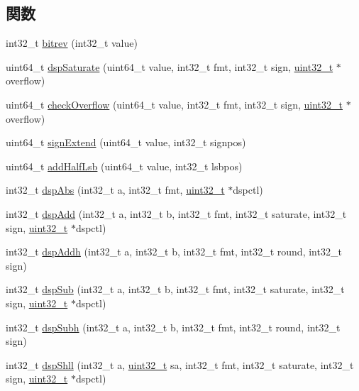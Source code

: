 \subsection*{関数}
\begin{DoxyCompactItemize}
\item 
int32\_\-t \hyperlink{namespaceMipsISA_a2754048764e174b0f0803486e4f829fd}{bitrev} (int32\_\-t value)
\item 
uint64\_\-t \hyperlink{namespaceMipsISA_a6853d9869c3a54c5a5cd34594ecf1f30}{dspSaturate} (uint64\_\-t value, int32\_\-t fmt, int32\_\-t sign, \hyperlink{Type_8hh_a435d1572bf3f880d55459d9805097f62}{uint32\_\-t} $\ast$overflow)
\item 
uint64\_\-t \hyperlink{namespaceMipsISA_aa0232b8b21b63c7893efa2ccbe2ad833}{checkOverflow} (uint64\_\-t value, int32\_\-t fmt, int32\_\-t sign, \hyperlink{Type_8hh_a435d1572bf3f880d55459d9805097f62}{uint32\_\-t} $\ast$overflow)
\item 
uint64\_\-t \hyperlink{namespaceMipsISA_a769dba9c69d884afe2d99cd0fcdb17bb}{signExtend} (uint64\_\-t value, int32\_\-t signpos)
\item 
uint64\_\-t \hyperlink{namespaceMipsISA_a6ca3b5075cddff927b0b7870b8b73d5f}{addHalfLsb} (uint64\_\-t value, int32\_\-t lsbpos)
\item 
int32\_\-t \hyperlink{namespaceMipsISA_a31dde0cc194f6c034d86c7c15efeb4c0}{dspAbs} (int32\_\-t a, int32\_\-t fmt, \hyperlink{Type_8hh_a435d1572bf3f880d55459d9805097f62}{uint32\_\-t} $\ast$dspctl)
\item 
int32\_\-t \hyperlink{namespaceMipsISA_a705975465e26de40169cc93f7a09aa3b}{dspAdd} (int32\_\-t a, int32\_\-t b, int32\_\-t fmt, int32\_\-t saturate, int32\_\-t sign, \hyperlink{Type_8hh_a435d1572bf3f880d55459d9805097f62}{uint32\_\-t} $\ast$dspctl)
\item 
int32\_\-t \hyperlink{namespaceMipsISA_a6fd720eeab47ea9cf3354a636744e70c}{dspAddh} (int32\_\-t a, int32\_\-t b, int32\_\-t fmt, int32\_\-t round, int32\_\-t sign)
\item 
int32\_\-t \hyperlink{namespaceMipsISA_a6fe8ea50b57a4afbe6899cf5fcd52298}{dspSub} (int32\_\-t a, int32\_\-t b, int32\_\-t fmt, int32\_\-t saturate, int32\_\-t sign, \hyperlink{Type_8hh_a435d1572bf3f880d55459d9805097f62}{uint32\_\-t} $\ast$dspctl)
\item 
int32\_\-t \hyperlink{namespaceMipsISA_ae22415bc9fdff6776d8b6d96a0dbea4e}{dspSubh} (int32\_\-t a, int32\_\-t b, int32\_\-t fmt, int32\_\-t round, int32\_\-t sign)
\item 
int32\_\-t \hyperlink{namespaceMipsISA_a68ada9e81042546a67dd29c6a65ce5c3}{dspShll} (int32\_\-t a, \hyperlink{Type_8hh_a435d1572bf3f880d55459d9805097f62}{uint32\_\-t} sa, int32\_\-t fmt, int32\_\-t saturate, int32\_\-t sign, \hyperlink{Type_8hh_a435d1572bf3f880d55459d9805097f62}{uint32\_\-t} $\ast$dspctl)

\end{DoxyCompactItemize}
